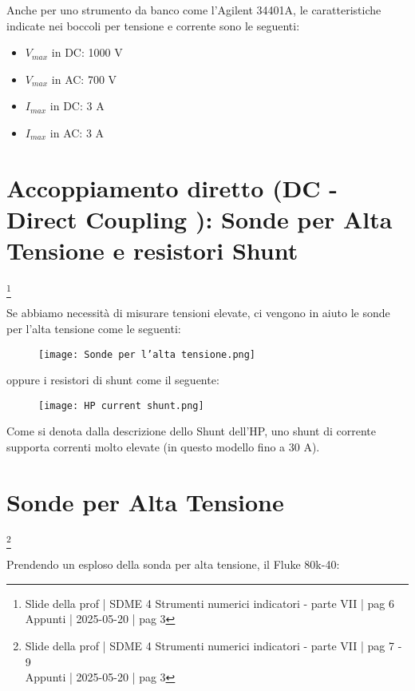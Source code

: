 Anche per uno strumento da banco come l'Agilent 34401A, le caratteristiche indicate nei boccoli per tensione e corrente sono le seguenti: 

\begin{itemize}
    \item $V_{max}$ in DC: 1000 V 
    \item $V_{max}$ in AC: 700 V
    \item $I_{max}$ in DC: 3 A 
    \item $I_{max}$ in AC: 3 A
\end{itemize}

\newpage 

\section{Accoppiamento diretto (DC - Direct Coupling ): Sonde per Alta Tensione e resistori Shunt}
\footnote{Slide della prof | SDME 4 Strumenti numerici indicatori - parte VII | pag 6\\  
Appunti | 2025-05-20 | pag 3 }

Se abbiamo necessità di misurare tensioni elevate, ci vengono in aiuto le sonde per l'alta tensione come le seguenti: 

\begin{figure}[h]
    \centering
    \texttt{[image: Sonde per l'alta tensione.png]}
\end{figure}

oppure i resistori di shunt come il seguente: 

\begin{figure}[h]
    \centering
    \texttt{[image: HP current shunt.png]}
\end{figure}

Come si denota dalla descrizione dello Shunt dell'HP, 
uno shunt di corrente supporta correnti molto elevate (in questo modello fino a 30 A). \newline 

\newpage 

\section{Sonde per Alta Tensione}
\footnote{Slide della prof | SDME 4 Strumenti numerici indicatori - parte VII | pag 7 - 9\\  
Appunti | 2025-05-20 | pag 3 }

Prendendo un esploso della sonda per alta tensione, il Fluke 80k-40: 

